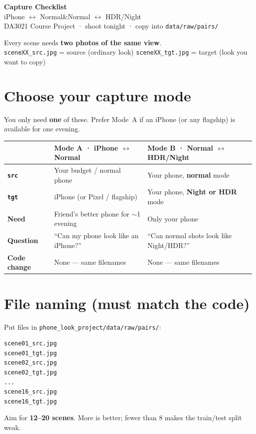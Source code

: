 \documentclass[11pt,a4paper]{article}
\begin{document}
\begin{center}
  {\LARGE\bfseries\color{ink} Capture Checklist}\\[0.35em]
  {\large\color{muted} iPhone $\leftrightarrow$ Normal\quad\&\quad Normal $\leftrightarrow$ HDR/Night}\\[0.5em]
  {\normalsize DA3021 Course Project · shoot tonight · copy into \texttt{data/raw/pairs/}}
\end{center}
\vspace{0.4em}

\begin{tcolorbox}[title=One rule for both modes]
Every scene needs \textbf{two photos of the same view}.\\
\texttt{sceneXX\_src.jpg} = source (ordinary look)\qquad
\texttt{sceneXX\_tgt.jpg} = target (look you want to copy)
\end{tcolorbox}

\section{Choose your capture mode}
You only need \textbf{one} of these. Prefer Mode~A if an iPhone (or any flagship) is available for one evening.

\begin{center}
\renewcommand{\arraystretch}{1.25}
\begin{tabular}{@{}>{\bfseries}l p{5.6cm} p{5.6cm}@{}}
\toprule
 & \textbf{Mode A · iPhone $\leftrightarrow$ Normal} & \textbf{Mode B · Normal $\leftrightarrow$ HDR/Night} \\
\midrule
\texttt{src} & Your budget / normal phone & Your phone, \textbf{normal} mode \\
\texttt{tgt} & iPhone (or Pixel / flagship) & Your phone, \textbf{Night or HDR} mode \\
Need & Friend's better phone for $\sim$1 evening & Only your phone \\
Question & ``Can my phone look like an iPhone?'' & ``Can normal shots look like Night/HDR?'' \\
Code change & None --- same filenames & None --- same filenames \\
\bottomrule
\end{tabular}
\end{center}

\section{File naming (must match the code)}
Put files in \texttt{phone\_look\_project/data/raw/pairs/}:
\begin{verbatim}
scene01_src.jpg
scene01_tgt.jpg
scene02_src.jpg
scene02_tgt.jpg
...
scene16_src.jpg
scene16_tgt.jpg
\end{verbatim}
Aim for \textbf{12--20 scenes}. More is better; fewer than 8 makes the train/test split weak.
\end{document}
